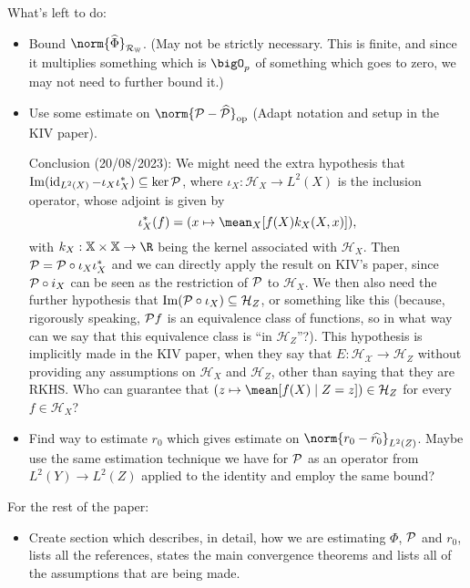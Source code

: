 {\color{red}
    What's left to do:
    \begin{itemize}
        \item Bound $ \norm{ \hat{ \Phi } }_{ \mathcal{R}_{ \mathbb{W} } } $. (May not be strictly necessary. This is finite, and since it multiplies something which is $ \bigO_{ p } $ of something which goes to zero, we may not need to further bound it.) 

        \item Use some estimate on $ \norm{ \meanop - \hat{ \meanop } }_{ \mathrm{op} } $ (Adapt notation and setup in the KIV paper).

            {\color{blue}
                Conclusion (20/08/2023): We might need the extra hypothesis that $ \operatorname{Im} ( \operatorname{id}_{ L^2 ( X ) } - \iota_{ X } \iota_{ X }^{ * } ) \subseteq \ker \mathcal{P} $, where $ \iota_{ X } : \mathcal{H}_{ X } \to L^{ 2 } ( X ) $ is the inclusion operator, whose adjoint is given by
                \begin{equation*}
                    \iota_{ X }^{ * } ( f ) = ( x \mapsto \mean_{ X } [ f ( X ) k_{ X } ( X, x ) ] )
                ,\end{equation*}
                with $ k_{ X } : \mathbb{X} \times \mathbb{X} \to \R $ being the kernel associated with $ \mathcal{H}_{ X } $.
                Then $ \mathcal{P} = \mathcal{P} \circ \iota_{ X } \iota_{ X }^{ * } $ and we can directly apply the result on KIV's paper, since $ \mathcal{P} \circ i_{ X } $ can be seen as the restriction of $ \mathcal{P} $ to $ \mathcal{H}_{ X } $.
                We then also need the further hypothesis that $ \operatorname{Im} ( \mathcal{P} \circ \iota_{ X } ) \subseteq \mathcal{H}_{ Z } $, or something like this (because, rigorously speaking, $ \mathcal{P} f $ is an equivalence class of functions, so in what way can we say that this equivalence class is ``in $ \mathcal{H}_{ Z } $''?).
                This hypothesis is implicitly made in the KIV paper, when they say that $ E : \mathcal{H_{ X }} \to \mathcal{H}_{ Z } $ without providing any assumptions on $ \mathcal{H}_{ X } $ and $ \mathcal{H}_{ Z } $, other than saying that they are RKHS.
                Who can guarantee that $ (z \mapsto \mean [ f ( X ) \mid Z = z ]) \in \mathcal{H}_{ Z } $ for every $ f \in \mathcal{H}_{ X } $?
            }

        \item Find way to estimate $ r_{ 0 } $ which gives estimate on $ \norm{ r_{ 0 } - \hat{ r_{ 0 } } }_{ L^{ 2 } ( Z ) } $.
            Maybe use the same estimation technique we have for $ \mathcal{P} $ as an operator from $ L^2 ( Y ) \to L^2 ( Z ) $ applied to the identity and employ the same bound?
    \end{itemize}
    For the rest of the paper:
    \begin{itemize}
        \item Create section which describes, in detail, how we are estimating $ \Phi $, $ \mathcal{P} $ and $ r_{ 0 } $, lists all the references, states the main convergence theorems and lists all of the assumptions that are being made.


\end{itemize}}
